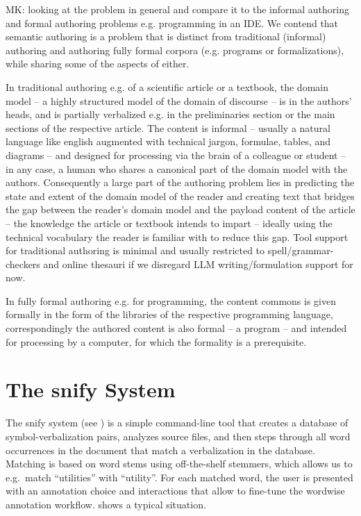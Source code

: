 \documentclass{llncs}
\newcommand\snify{\textsf{snify}\xspace}
\begin{document}
\begin{newpart}{MK: looking at the problem in general and compare it to the informal
    authoring and formal authoring problems e.g. programming in an IDE.}
We contend that semantic authoring is a problem that is distinct from traditional
(informal) authoring and authoring fully formal corpora (e.g. programs or formalizations),
while sharing some of the aspects of either.

In traditional authoring e.g. of a scientific article or a textbook, the domain model -- a
highly structured model of the domain of discourse -- is in the authors' heads, and is
partially verbalized e.g. in the preliminaries section or the main sections of the
respective article. The content is informal -- usually a natural language like english
augmented with technical jargon, formulae, tables, and diagrams -- and designed for
processing via the brain of a colleague or student -- in any case, a human who shares a
canonical part of the domain model with the authors. Consequently a large part of the authoring problem lies in
predicting the state and extent of the domain model of the reader and creating text that
bridges the gap between the reader's domain model and the payload content of the article
-- the knowledge the article or textbook intends to impart -- ideally using the technical
vocabulary the reader is familiar with to reduce this gap. Tool support for traditional
authoring is minimal and usually restricted to spell/grammar-checkers and online thesauri
if we disregard LLM writing/formulation support for now.

In fully formal authoring e.g. for programming, the content commons is given formally in
the form of the libraries of the respective programming language, correspondingly the
authored content is also formal -- a program -- and intended for processing by a computer,
for which the formality is a prerequisite. 

\end{newpart}

  
\section{The \snify System}

The \snify{}
system (see \cite{stextools:git}) is a simple command-line tool
that creates a database of symbol-verbalization pairs, analyzes \sTeX source files,
and then steps through all word occurrences in the document that match a
verbalization in the database.
Matching is based on word stems using off-the-shelf stemmers, which allows us to
e.g.\ match ``utilities'' with ``utility''.
For each matched word, the user is presented with an annotation choice and
interactions that allow to fine-tune the wordwise annotation workflow. 
shows a typical situation.
\end{document}
